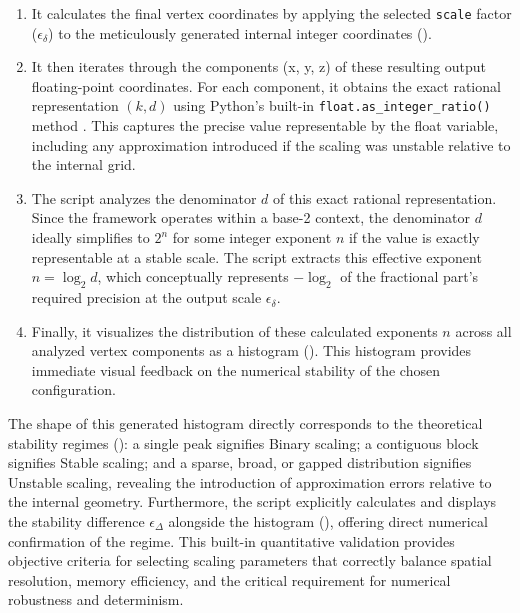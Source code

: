 \documentclass[10pt]{article}
\begin{document}
\begin{enumerate}\itemsep0pt
    \item It calculates the final vertex coordinates by applying the selected \texttt{scale} factor ($\epsilon_\delta$) to the meticulously generated internal integer coordinates ().
    \item It then iterates through the components (x, y, z) of these resulting output floating-point coordinates. For each component, it obtains the exact rational representation $(k, d)$ using Python's built-in \texttt{float.as\_integer\_ratio()} method \cite{PythonDocsFloatRatio}. This captures the precise value representable by the float variable, including any approximation introduced if the scaling was unstable relative to the internal grid.
    \item The script analyzes the denominator $d$ of this exact rational representation. Since the framework operates within a base-2 context, the denominator $d$ ideally simplifies to $2^n$ for some integer exponent $n$ if the value is exactly representable at a stable scale. The script extracts this effective exponent $n = \log_2 d$, which conceptually represents $-\log_2$ of the fractional part's required precision at the output scale $\epsilon_\delta$.
    \item Finally, it visualizes the distribution of these calculated exponents $n$ across all analyzed vertex components as a histogram (). This histogram provides immediate visual feedback on the numerical stability of the chosen configuration.
\end{enumerate}

The shape of this generated histogram directly corresponds to the theoretical stability regimes (): a single peak signifies Binary scaling; a contiguous block signifies Stable scaling; and a sparse, broad, or gapped distribution signifies Unstable scaling, revealing the introduction of approximation errors relative to the internal geometry. Furthermore, the script explicitly calculates and displays the stability difference $\epsilon_\Delta$ alongside the histogram (), offering direct numerical confirmation of the regime. This built-in quantitative validation provides objective criteria for selecting scaling parameters that correctly balance spatial resolution, memory efficiency, and the critical requirement for numerical robustness and determinism.
\end{document}
